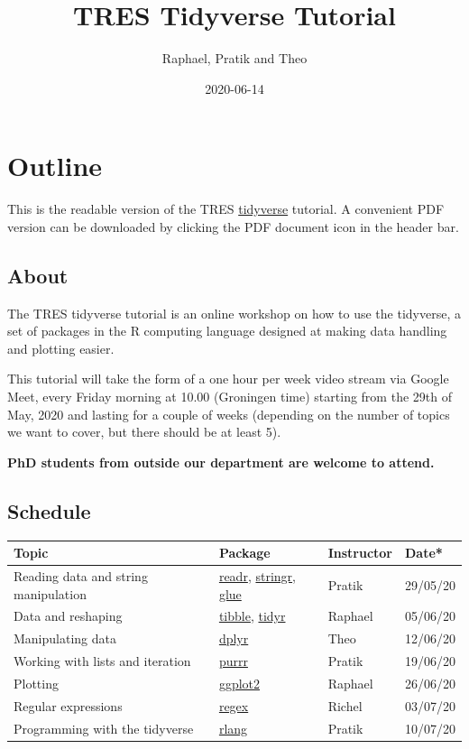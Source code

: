 \documentclass[]{book}
\title{TRES Tidyverse Tutorial}
\author{Raphael, Pratik and Theo}
\date{2020-06-14}
\begin{document}
\maketitle


\linenumbers

{
\setcounter{tocdepth}{1}
\tableofcontents
}
\hypertarget{outline}{%
\chapter*{Outline}\label{outline}}

This is the readable version of the TRES \href{https://www.tidyverse.org/}{tidyverse} tutorial. A convenient PDF version can be downloaded by clicking the PDF document icon in the header bar.

\hypertarget{about}{%
\section*{About}\label{about}}

The TRES tidyverse tutorial is an online workshop on how to use the tidyverse, a set of packages in the R computing language designed at making data handling and plotting easier.

This tutorial will take the form of a one hour per week video stream via Google Meet, every Friday morning at 10.00 (Groningen time) starting from the 29th of May, 2020 and lasting for a couple of weeks (depending on the number of topics we want to cover, but there should be at least 5).

\textbf{PhD students from outside our department are welcome to attend.}

\hypertarget{schedule}{%
\section*{Schedule}\label{schedule}}

\begin{longtable}[]{@{}llll@{}}
\toprule
Topic & Package & Instructor & Date*\tabularnewline
\midrule
\endhead
Reading data and string manipulation & \href{https://readr.tidyverse.org/}{readr}, \href{https://stringr.tidyverse.org/}{stringr}, \href{https://github.com/tidyverse/glue}{glue} & Pratik & 29/05/20\tabularnewline
Data and reshaping & \href{https://tibble.tidyverse.org/}{tibble}, \href{https://tidyr.tidyverse.org/}{tidyr} & Raphael & 05/06/20\tabularnewline
Manipulating data & \href{https://dplyr.tidyverse.org/}{dplyr} & Theo & 12/06/20\tabularnewline
Working with lists and iteration & \href{https://purrr.tidyverse.org/}{purrr} & Pratik & 19/06/20\tabularnewline
Plotting & \href{https://ggplot2.tidyverse.org/}{ggplot2} & Raphael & 26/06/20\tabularnewline
Regular expressions & \href{https://stat.ethz.ch/R-manual/R-devel/library/base/html/regex.html}{regex} & Richel & 03/07/20\tabularnewline
Programming with the tidyverse & \href{https://rlang.r-lib.org/}{rlang} & Pratik & 10/07/20\tabularnewline
\bottomrule
\end{longtable}
\end{document}
